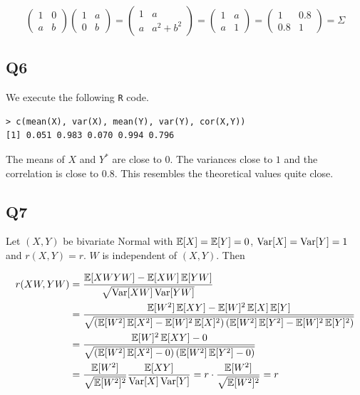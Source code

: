 \begin{equation}
\begin{pmatrix}
1 & 0 \\
a & b
\end{pmatrix}
\begin{pmatrix}
1 & a \\
0 & b
\end{pmatrix}
=
\begin{pmatrix}
1 & a \\
a & a^2 + b^2
\end{pmatrix}
=
\begin{pmatrix}
1 & a \\
a & 1
\end{pmatrix}
=
\begin{pmatrix}
1 & 0.8 \\
0.8 & 1
\end{pmatrix}
= \Sigma
\end{equation}

\subsection*{Q6}
We execute the following \verb|R| code.
\begin{verbatim}
> c(mean(X), var(X), mean(Y), var(Y), cor(X,Y))
[1] 0.051 0.983 0.070 0.994 0.796
\end{verbatim}

The means of $X$ and $Y^*$ are close to $0$. The variances close to $1$ and the correlation is close to $0.8$. This resembles the theoretical values quite close.

\subsection*{Q7}
Let $(X, Y)$ be bivariate Normal with $\E[X] = \E[Y] = 0$, $\Var[X] = \Var[Y] = 1$ and $r(X,Y) = r$. $W$ is independent of $(X, Y)$. Then

\begin{align}
r(XW, YW) & = \frac{\E[XWYW] - \E[XW]\E[YW]}{\sqrt{\Var[XW] \Var[YW]}} \\
	      & = \frac{\E[W^2]\E[XY] - \E[W]^2\E[X]\E[Y]}{\sqrt{\left(\E[W^2]\E[X^2] - \E[W]^2\E[X]^2\right)\left(\E[W^2]\E[Y^2] - \E[W]^2\E[Y]^2\right)}} \\
	      & = \frac{\E[W]^2\E[XY] - 0}{\sqrt{\left(\E[W^2]\E[X^2] - 0\right)\left(\E[W^2]\E[Y^2] - 0\right)}} \\ 
	      & = \frac{\E[W^2]}{\sqrt{\E[W^2]^2}} \frac{\E[XY]}{\Var[X]\Var[Y]} = r \cdot \frac{\E[W^2]}{\sqrt{\E[W^2]^2}} = r
\end{align}

